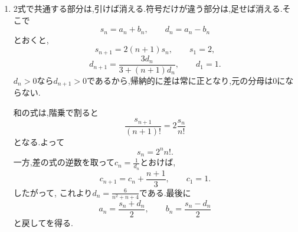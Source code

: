 \begin{enumerate}[label=\textbf{問\arabic*.},leftmargin=3.8em,format=\bookitemlink{practice-advanced}{solution}{problem}]
                \noindent \textbf{【別解】}\\
                逆数の式で,平行移動せず直接両辺に$n+1$を掛けてもよい.
                \[
                  (n+1)c_{n+1}-nc_n=1.
                \]
                したがって$e_n=nc_n$は公差$1$のであり,\, $\displaystyle e_1=\frac{1}{2}$から
                \[
                  e_n=n-\frac12,\qquad c_n=1-\frac1{2n}
                \]
                となる.を引く方法と,添字を掛けてを一定にする方法の両方が使える.
          \item 2式で共通する部分は,引けば消える.符号だけが違う部分は,足せば消える.そこで
                \[
                  s_n=a_n+b_n,\qquad d_n=a_n-b_n
                \]
                とおくと,
                \[
                  s_{n+1}=2(n+1)s_n,\qquad s_1=2,
                \]
                \[
                  d_{n+1}
                   =\frac{3d_n}{3+(n+1)d_n},\qquad d_1=1.
                \]
                $d_n>0$なら$d_{n+1}>0$であるから,帰納的に差は常に正となり,元の分母は$0$にならない.

                和の式は,階乗で割ると
                \[
                  \frac{s_{n+1}}{(n+1)!}=2\frac{s_n}{n!}
                \]
                となる.よって
                \[
                  s_n=2^n n!.
                \]
                一方,差の式の逆数を取って$\displaystyle c_n=\frac{1}{d_n}$とおけば,
                \[
                  c_{n+1}=c_n+\frac{n+1}{3},\qquad c_1=1.
                \]
                したがって,
                これより$\displaystyle d_n=\frac{6}{n^2+n+4}$である.最後に
                \[
                  a_n=\frac{s_n+d_n}{2},\qquad
                  b_n=\frac{s_n-d_n}{2}
                \]
                と戻してを得る.


\end{enumerate}

